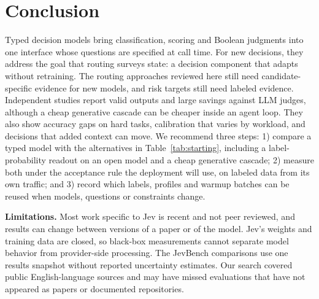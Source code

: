 \section{Conclusion}
\label{sec:conclusion}

Typed decision models bring classification, scoring and Boolean judgments into one interface whose questions are specified at call time. For new decisions, they address the goal that routing surveys state: a decision component that adapts without retraining. The routing approaches reviewed here still need candidate-specific evidence for new models, and risk targets still need labeled evidence. Independent studies report valid outputs and large savings against LLM judges, although a cheap generative cascade can be cheaper inside an agent loop. They also show accuracy gaps on hard tasks, calibration that varies by workload, and decisions that added context can move. We recommend three steps: 1) compare a typed model with the alternatives in Table~\ref{tab:starting}, including a label-probability readout on an open model and a cheap generative cascade; 2) measure both under the acceptance rule the deployment will use, on labeled data from its own traffic; and 3) record which labels, profiles and warmup batches can be reused when models, questions or constraints change.

\noindent\textbf{Limitations.} Most work specific to Jev is recent and not peer reviewed, and results can change between versions of a paper or of the model. Jev's weights and training data are closed, so black-box measurements cannot separate model behavior from provider-side processing. The JevBench comparisons use one results snapshot without reported uncertainty estimates. Our search covered public English-language sources and may have missed evaluations that have not appeared as papers or documented repositories. 
